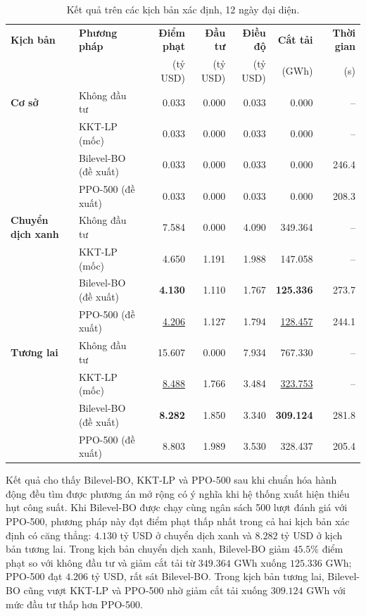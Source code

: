 \begin{table}[!ht]
    \centering
    \caption{Kết quả trên các kịch bản xác định, 12 ngày đại diện.}
    \label{tab:deterministic_results}
    \scriptsize
    \begin{tabular}{llrrrrr}
        \hline
        \textbf{Kịch bản} & \textbf{Phương pháp} & \textbf{Điểm phạt} & \textbf{Đầu tư} & \textbf{Điều độ} & \textbf{Cắt tải} & \textbf{Thời gian} \\
        & & (tỷ USD) & (tỷ USD) & (tỷ USD) & (GWh) & (s) \\
        \hline
        \textbf{Cơ sở} & Không đầu tư & 0.033 & 0.000 & 0.033 & 0.000 & -- \\
        & KKT-LP (mốc) & 0.033 & 0.000 & 0.033 & 0.000 & -- \\
        & Bilevel-BO (đề xuất) & 0.033 & 0.000 & 0.033 & 0.000 & 246.4 \\
        & PPO-500 (đề xuất) & 0.033 & 0.000 & 0.033 & 0.000 & 208.3 \\
        \hline
        \textbf{Chuyển dịch xanh} & Không đầu tư & 7.584 & 0.000 & 4.090 & 349.364 & -- \\
        & KKT-LP (mốc) & 4.650 & 1.191 & 1.988 & 147.058 & -- \\
        & Bilevel-BO (đề xuất) & \textbf{4.130} & 1.110 & 1.767 & \textbf{125.336} & 273.7 \\
        & PPO-500 (đề xuất) & \underline{4.206} & 1.127 & 1.794 & \underline{128.457} & 244.1 \\
        \hline
        \textbf{Tương lai} & Không đầu tư & 15.607 & 0.000 & 7.934 & 767.330 & -- \\
        & KKT-LP (mốc) & \underline{8.488} & 1.766 & 3.484 & \underline{323.753} & -- \\
        & Bilevel-BO (đề xuất) & \textbf{8.282} & 1.850 & 3.340 & \textbf{309.124} & 281.8 \\
        & PPO-500 (đề xuất) & 8.803 & 1.989 & 3.530 & 328.437 & 205.4 \\
        \hline
    \end{tabular}
\end{table}

Kết quả cho thấy Bilevel-BO, KKT-LP và PPO-500 sau khi chuẩn hóa hành động đều tìm được phương án mở rộng có ý nghĩa khi hệ thống xuất hiện thiếu hụt công suất. Khi Bilevel-BO được chạy cùng ngân sách 500 lượt đánh giá với PPO-500, phương pháp này đạt điểm phạt thấp nhất trong cả hai kịch bản xác định có căng thẳng: $4.130$ tỷ USD ở chuyển dịch xanh và $8.282$ tỷ USD ở kịch bản tương lai. Trong kịch bản chuyển dịch xanh, Bilevel-BO giảm $45.5\%$ điểm phạt so với không đầu tư và giảm cắt tải từ $349.364$ GWh xuống $125.336$ GWh; PPO-500 đạt $4.206$ tỷ USD, rất sát Bilevel-BO. Trong kịch bản tương lai, Bilevel-BO cũng vượt KKT-LP và PPO-500 nhờ giảm cắt tải xuống $309.124$ GWh với mức đầu tư thấp hơn PPO-500.

